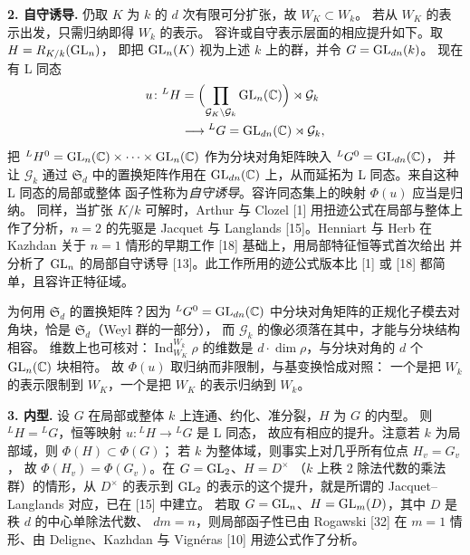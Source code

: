 \par\medskip\noindent\textbf{2. 自守诱导.}\quad
仍取 $K$ 为 $k$ 的 $d$ 次有限可分扩张，故 $W_K\subset W_k$。
若从 $W_K$ 的表示出发，只需归纳即得 $W_k$ 的表示。
容许或自守表示层面的相应提升如下。取 $H=R_{K/k}(\mathrm{GL}_n)$，
即把 $\mathrm{GL}_n(K)$ 视为上述 $k$ 上的群，并令 $G=\mathrm{GL}_{dn}(k)$。
现在有 L 同态
\[
\begin{aligned}
  u\colon{}^{L}H&=\Bigl(\prod_{\mathcal{G}_K\backslash\mathcal{G}_k}
  \mathrm{GL}_n(\mathbb{C})\Bigr)\rtimes\mathcal{G}_k\\
  &\longrightarrow{}^{L}G=\mathrm{GL}_{dn}(\mathbb{C})\rtimes\mathcal{G}_k,
\end{aligned}
\]
把 ${}^{L}H^{0}=\mathrm{GL}_n(\mathbb{C})\times\cdots\times\mathrm{GL}_n(\mathbb{C})$
作为分块对角矩阵映入 ${}^{L}G^{0}=\mathrm{GL}_{dn}(\mathbb{C})$，
并让 $\mathcal{G}_k$ 通过 $\mathfrak{S}_d$ 中的置换矩阵作用在
$\mathrm{GL}_{dn}(\mathbb{C})$ 上，从而延拓为 L 同态。来自这种 L 同态的局部或整体
函子性称为\emph{自守诱导}。容许同态集上的映射 $\Phi(u)$ 应当是归纳。
同样，当扩张 $K/k$ 可解时，Arthur 与 Clozel [1] 用扭迹公式在局部与整体上
作了分析，$n=2$ 的先驱是 Jacquet 与 Langlands [15]。Henniart 与 Herb 在
Kazhdan 关于 $n=1$ 情形的早期工作 [18] 基础上，用局部特征恒等式首次给出
并分析了 $\mathrm{GL}_n$ 的局部自守诱导 [13]。此工作所用的迹公式版本比 [1] 或 [18]
都简单，且容许正特征域。
\begin{annote}
为何用 $\mathfrak{S}_d$ 的置换矩阵？因为 ${}^{L}G^{0}=\mathrm{GL}_{dn}(\mathbb{C})$
中分块对角矩阵的正规化子模去对角块，恰是 $\mathfrak{S}_d$（Weyl 群的一部分），
而 $\mathcal{G}_k$ 的像必须落在其中，才能与分块结构相容。
维数上也可核对：$\operatorname{Ind}_{W_K}^{W_k}\rho$ 的维数是
$d\cdot\dim\rho$，与分块对角的 $d$ 个 $\mathrm{GL}_n(\mathbb{C})$ 块相符。
故 $\Phi(u)$ 取归纳而非限制，与基变换恰成对照：
一个是把 $W_k$ 的表示限制到 $W_K$，一个是把 $W_K$ 的表示归纳到 $W_k$。
\par{}
\end{annote}

\par\medskip\noindent\textbf{3. 内型.}\quad
设 $G$ 在局部或整体 $k$ 上连通、约化、准分裂，$H$ 为 $G$ 的内型。
则 ${}^{L}H={}^{L}G$，恒等映射 $u\colon{}^{L}H\to{}^{L}G$ 是 L 同态，
故应有相应的提升。注意若 $k$ 为局部域，则 $\Phi(H)\subset\Phi(G)$；
若 $k$ 为整体域，则事实上对几乎所有位点 $H_v=G_v$，
故 $\Phi(H_v)=\Phi(G_v)$。在 $G=\mathrm{GL}_2$、$H=D^{\times}$
（$k$ 上秩 2 除法代数的乘法群）的情形，从 $D^{\times}$ 的表示到 $\mathrm{GL}_2$
的表示的这个提升，就是所谓的 Jacquet--Langlands 对应，已在 [15] 中建立。
若取 $G=\mathrm{GL}_n$、$H=\mathrm{GL}_m(D)$，其中 $D$ 是秩 $d$ 的中心单除法代数、
$dm=n$，则局部函子性已由 Rogawski [32] 在 $m=1$ 情形、由 Deligne、Kazhdan
与 Vignéras [10] 用迹公式作了分析。

